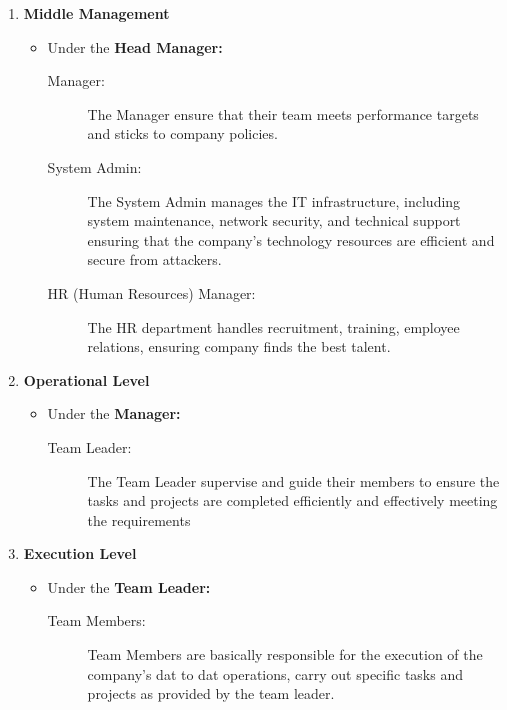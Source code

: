 \begin{enumerate}
            \item \textbf{Middle Management}
            \begin{itemize}
                \item Under the \textbf{Head Manager:}
            \begin{description}
                \item[Manager: ] The Manager ensure that their team meets performance targets and sticks to company policies. 
                \item[System Admin: ] The System Admin manages the IT infrastructure, including system maintenance, network security, and technical support ensuring that the company’s technology resources are efficient and secure from attackers.
                \item[HR (Human Resources) Manager:] The HR department handles recruitment, training, employee relations, ensuring company finds the best talent.
            \end{description}
            \end{itemize}
            \item \textbf{Operational Level}
            \begin{itemize}
                \item Under the \textbf{Manager:}
            \begin{description}
                \item[Team Leader: ] The Team Leader supervise and guide their members to ensure the tasks and projects are completed efficiently and effectively meeting the requirements 
            \end{description}
            \end{itemize}
            \item \textbf{Execution Level}
            \begin{itemize}
                \item Under the \textbf{Team Leader:}
            \begin{description}
                \item[Team Members:] Team Members are basically responsible for the execution of the company's dat to dat operations, carry out specific tasks and projects as provided by the team leader.
            \end{description}
            \end{itemize}
        \end{enumerate}
